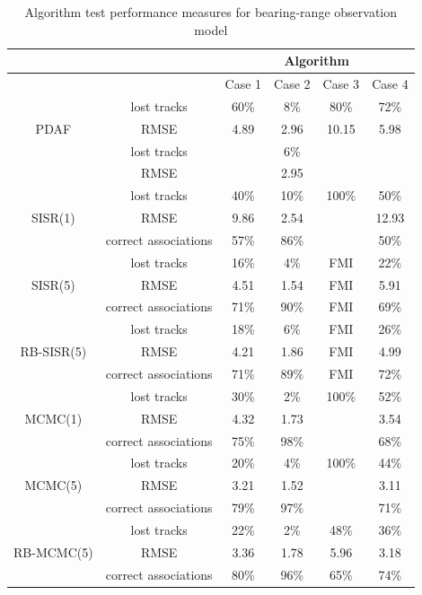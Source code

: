 \begin{table} \centering
\begin{tabular}{|c|c|c|c|c|c|}
\hline
 & & \multicolumn{4}{|c|}{Algorithm} \\
\hline
 & & Case 1 & Case 2 & Case 3 & Case 4 \\
\hline
\multirow{3}{*}{PDAF} & lost tracks             & 60\% & 8\% & 80\% & 72\% \\
                         & RMSE                 & 4.89 & 2.96 & 10.15 & 5.98 \\
\hline
\multirow{3}{*}{JPDAF} & lost tracks            &  & 6\% &  &  \\
                         & RMSE                 &  & 2.95 &  &  \\
\hline
\multirow{3}{*}{SISR(1)} & lost tracks          & 40\% & 10\% & 100\% & 50\% \\
                         & RMSE                 & 9.86 & 2.54 &  & 12.93 \\
                         & correct associations & 57\% & 86\% &  & 50\% \\
\hline
\multirow{3}{*}{SISR(5)} & lost tracks          & 16\% & 4\% & FMI & 22\% \\
                         & RMSE                 & 4.51 & 1.54 & FMI & 5.91 \\
                         & correct associations & 71\% & 90\% & FMI & 69\% \\
\hline
\multirow{3}{*}{RB-SISR(5)} & lost tracks       & 18\% & 6\% & FMI & 26\% \\
                         & RMSE                 & 4.21 & 1.86 & FMI & 4.99 \\
                         & correct associations & 71\% & 89\% & FMI & 72\% \\
\hline
\multirow{3}{*}{MCMC(1)} & lost tracks          & 30\% & 2\% & 100\% & 52\% \\
                         & RMSE                 & 4.32 & 1.73 &  & 3.54 \\
                         & correct associations & 75\% & 98\% &  & 68\% \\
\hline
\multirow{3}{*}{MCMC(5)} & lost tracks          & 20\% & 4\% & 100\% & 44\% \\
                         & RMSE                 & 3.21 & 1.52 &  & 3.11 \\
                         & correct associations & 79\% & 97\% &  & 71\% \\
\hline
\multirow{3}{*}{RB-MCMC(5)} & lost tracks       & 22\% & 2\% & 48\% & 36\% \\
                         & RMSE                 & 3.36 & 1.78 & 5.96 & 3.18 \\
                         & correct associations & 80\% & 96\% & 65\% & 74\% \\
\hline
\end{tabular}
\caption{Algorithm test performance measures for bearing-range observation model}
\label{tab:ResultsRadar}
\end{table}

